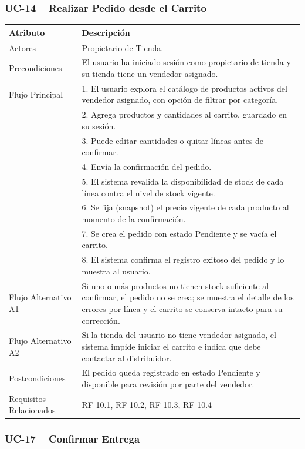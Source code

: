 \documentclass[12pt,a4paper]{report}
\begin{document}
\subsubsection{UC-14 -- Realizar Pedido desde el Carrito}

\begin{longtable}{|p{4cm}|p{10cm}|}
\hline
\textbf{Atributo} & \textbf{Descripción} \\ \hline
Actores & Propietario de Tienda. \\ \hline
Precondiciones & El usuario ha iniciado sesión como propietario de tienda y su tienda tiene un vendedor asignado. \\ \hline
Flujo Principal &
1. El usuario explora el catálogo de productos activos del vendedor asignado, con opción de filtrar por categoría.\\
& 2. Agrega productos y cantidades al carrito, guardado en su sesión.\\
& 3. Puede editar cantidades o quitar líneas antes de confirmar.\\
& 4. Envía la confirmación del pedido.\\
& 5. El sistema revalida la disponibilidad de stock de cada línea contra el nivel de stock vigente.\\
& 6. Se fija (snapshot) el precio vigente de cada producto al momento de la confirmación.\\
& 7. Se crea el pedido con estado Pendiente y se vacía el carrito.\\
& 8. El sistema confirma el registro exitoso del pedido y lo muestra al usuario. \\ \hline
Flujo Alternativo A1 & Si uno o más productos no tienen stock suficiente al confirmar, el pedido no se crea; se muestra el detalle de los errores por línea y el carrito se conserva intacto para su corrección. \\ \hline
Flujo Alternativo A2 & Si la tienda del usuario no tiene vendedor asignado, el sistema impide iniciar el carrito e indica que debe contactar al distribuidor. \\ \hline
Postcondiciones & El pedido queda registrado en estado Pendiente y disponible para revisión por parte del vendedor. \\ \hline
Requisitos Relacionados & RF-10.1, RF-10.2, RF-10.3, RF-10.4 \\ \hline
\end{longtable}


\subsubsection{UC-17 -- Confirmar Entrega}
\end{document}
